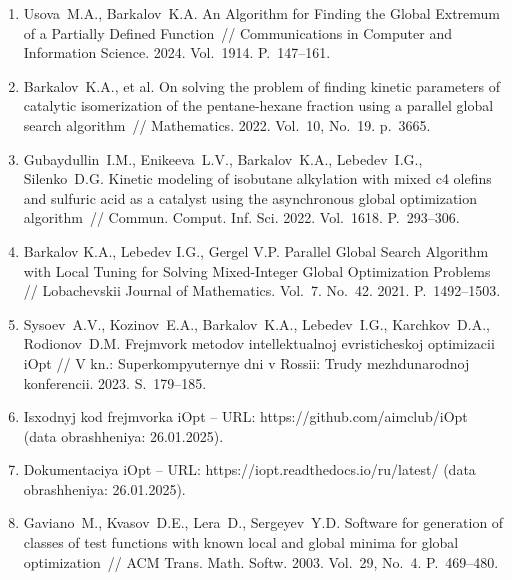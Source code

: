 \documentclass[a4paper,12pt,russian]{article}
\begin{document}
\begin{enumerate}
\item \label{rfa:enlit:Usova2024}
Usova~M.A., Barkalov~K.A. An Algorithm for Finding the Global Extremum of a Partially Defined Function~// Communications in Computer and Information Science. 2024. Vol.~1914. P.~147--161. %


\item \label{rfa:enlit:Barkalov2022}
Barkalov~K.A., et al. On solving the problem of finding kinetic parameters of catalytic isomerization of the pentane-hexane fraction using a parallel global search algorithm~// 
Mathematics. 2022. Vol.~10, No.~19. p.~3665. %

\item \label{rfa:enlit:Gubaydullin2022}
Gubaydullin~I.M., Enikeeva~L.V., Barkalov~K.A., Lebedev~I.G., Silenko~D.G. Kinetic modeling of isobutane alkylation with mixed c4 olefins and sulfuric acid as a catalyst using the asynchronous global optimization algorithm~// Commun. Comput. Inf. Sci. 2022. Vol.~1618. P.~293--306. %

\item \label{rfa:enlit:Barkalov2021}
Barkalov K.A., Lebedev I.G., Gergel V.P. Parallel Global Search Algorithm with Local Tuning for Solving Mixed-Integer Global Optimization Problems // Lobachevskii Journal of Mathematics. Vol.~7. No.~42. 2021. P.~1492--1503.

\item \label{rfa:enlit:iOptPaper}
Sysoev~A.V., Kozinov~E.A., Barkalov~K.A., Lebedev~I.G., Karchkov~D.A., Rodionov~D.M. Frejmvork metodov intellektualnoj evristicheskoj optimizacii iOpt // V kn.: Superkompyuternye dni v Rossii: Trudy mezhdunarodnoj konferencii. 2023. S.~179--185.

\item \label{rfa:enlit:iOptGithub}
Isxodnyj kod frejmvorka iOpt -- URL: https://github.com/aimclub/iOpt (data obrashheniya: 26.01.2025).

\item \label{rfa:enlit:iOptDocs}
Dokumentaciya iOpt -- URL: https://iopt.readthedocs.io/ru/latest/ (data obrashheniya: 26.01.2025).

\item \label{rfa:enlit:Gaviano2003}
Gaviano~M., Kvasov~D.E., Lera~D., Sergeyev~Y.D. Software for generation of classes of test functions with known local and global minima for global optimization~// ACM Trans. Math. Softw. 2003. Vol.~29, No.~4. P.~469--480.


\end{enumerate}
\end{document}
